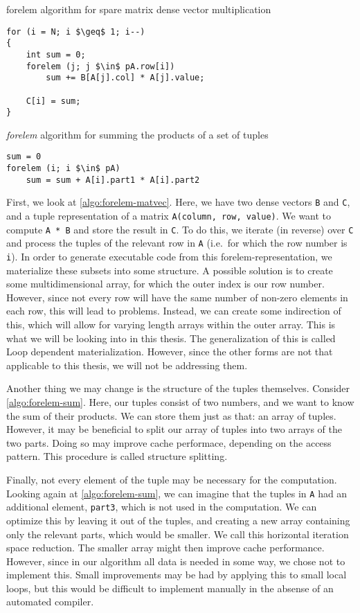 \begin{algorithm}
	\caption{forelem algorithm for spare matrix dense vector multiplication}
	\label{algo:forelem-matvec}
\begin{lstlisting}[mathescape]
for (i = N; i $\geq$ 1; i--)
{
	int sum = 0;
	forelem (j; j $\in$ pA.row[i])
		sum += B[A[j].col] * A[j].value;

	C[i] = sum;
}
\end{lstlisting}
\end{algorithm}

\begin{algorithm}
\caption{\emph{forelem} algorithm for summing the products of a set of tuples}
\label{algo:forelem-sum}
\begin{lstlisting}[mathescape]
sum = 0
forelem (i; i $\in$ pA)
	sum = sum + A[i].part1 * A[i].part2
\end{lstlisting}
\end{algorithm}

First, we look at \autoref{algo:forelem-matvec}. Here, we have two dense vectors \texttt{B} and \texttt{C}, and a tuple representation of a matrix \texttt{A(column, row, value)}. We want to compute \texttt{A * B} and store the result in \texttt{C}. To do this, we iterate (in reverse) over \texttt{C} and process the tuples of the relevant row in \texttt{A}  (i.e.\ for which the row number is \texttt{i}). In order to generate executable code from this forelem-representation, we materialize these subsets into some structure. A possible solution is to create some multidimensional array, for which the outer index is our row number. However, since not every row will have the same number of non-zero elements in each row, this will lead to problems. Instead, we can create some indirection of this, which will allow for varying length arrays within the outer array. This is what we will be looking into in this thesis. The generalization of this is called Loop dependent materialization. However, since the other forms are not that applicable to this thesis, we will not be addressing them.

Another thing we may change is the structure of the tuples themselves. Consider \autoref{algo:forelem-sum}. Here, our tuples consist of two numbers, and we want to know the sum of their products. We can store them just as that: an array of tuples. However, it may be beneficial to split our array of tuples into two arrays of the two parts. Doing so may improve cache performace, depending on the access pattern. This procedure is called structure splitting.

Finally, not every element of the tuple may be necessary for the computation. Looking again at \autoref{algo:forelem-sum}, we can imagine that the tuples in \texttt{A} had an additional element, \texttt{part3}, which is not used in the computation. We can optimize this by leaving it out of the tuples, and creating a new array containing only the relevant parts, which would be smaller. We call this horizontal iteration space reduction. The smaller array might then improve cache performance. However, since in our algorithm all data is needed in some way, we chose not to implement this. Small improvements may be had by applying this to small local loops, but this would be difficult to implement manually in the absense of an automated compiler.
